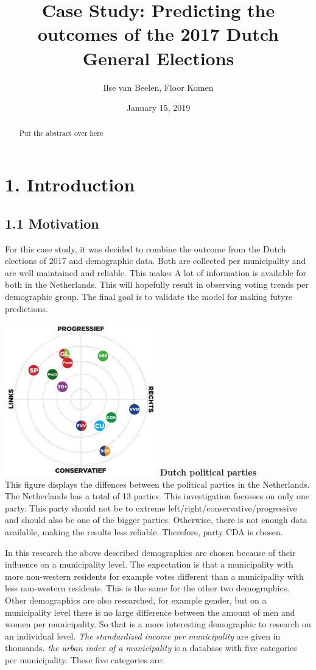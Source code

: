 \documentclass[11pt,]{article}
\title{Case Study: Predicting the outcomes of the 2017 Dutch General Elections}
\author{Ilse van Beelen, Floor Komen}
\date{January 15, 2019}
\begin{document}
\maketitle
\begin{abstract}
Put the abstract over here
\end{abstract}

\section{1. Introduction}\label{introduction}

\subsection{1.1 Motivation}\label{motivation}

For this case study, it was decided to combine the outcome from the
Dutch elections of 2017 and demographic data. Both are collected per
municipality and are well maintained and reliable. This makes A lot of
information is available for both in the Netherlands. This will
hopefully result in observing voting trends per demographic group. The
final goal is to validate the model for making futyre predictions.

\includegraphics[width=2.60417in]{Partijlandschap.jpg} \textbf{Dutch
political parties}\\
This figure displays the diffences between the political parties in the
Netherlands. The Netherlands has a total of 13 parties. This
investigation focusses on only one party. This party should not be to
extreme left/right/conservative/progressive and should also be one of
the bigger parties. Otherwise, there is not enough data available,
making the results less reliable. Therefore, party CDA is chosen.

In this research the above described demographics are chosen because of
their influence on a municipality level. The expectation is that a
municipality with more non-western residents for example votes different
than a municipality with less non-western residents. This is the same
for the other two demographics. Other demographics are also researched,
for example gender, but on a municipality level there is no large
difference between the amount of men and women per municipality. So that
is a more interesting demographic to research on an individual level.
\emph{The standardized income per municipality} are given in thousands.
\emph{the urban index of a municipality} is a database with five
categories per municipality. These five categories are:
\end{document}

